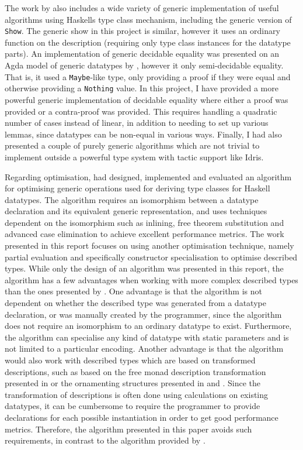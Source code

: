 \documentclass{ituthesis}
\newcommand{\ttconstructor}[1]{\textcolor{constructor-color}{\texttt{#1}}}
\newcommand{\tttype}[1]{\textcolor{type-color}{\texttt{#1}}}
\theoremstyle{break}
\begin{document}
The work by \citeauthor{magalhaes2012less} also includes a wide variety of generic implementation of useful algorithms using Haskells type class mechanism, including the generic version of \tttype{Show}.
The generic show in this project is similar, however it uses an ordinary function on the description (requiring only type class instances for the datatype parts).
An implementation of generic decidable equality was presented on an Agda model of generic datatypes by \citeauthor{magalhaes2012less}, however it only semi-decidable equality.
That is, it used a \tttype{Maybe}-like type, only providing a proof if they were equal and otherwise providing a \ttconstructor{Nothing} value.
In this project, I have provided a more powerful generic implementation of decidable equality where either a proof was provided or a contra-proof was provided.
This requires handling a quadratic number of cases instead of linear, in addition to needing to set up various lemmas, since datatypes can be non-equal in various ways.
Finally, I had also presented a couple of purely generic algorithms which are not trivial to implement outside a powerful type system with tactic support like Idris.

Regarding optimisation, \citeauthor{magalhaes2012less} had designed, implemented and evaluated an algorithm for optimising generic operations used for deriving type classes for Haskell datatypes.
The algorithm requires an isomorphism between a datatype declaration and its equivalent generic representation, and uses techniques dependent on the isomorphism such as inlining, free theorem substitution and advanced case elimination to achieve excellent performance metrics.
The work presented in this report focuses on using another optimisation technique, namely partial evaluation and specifically constructor specialisation to optimise described types.
While only the design of an algorithm was presented in this report, the algorithm has a few advantages when working with more complex described types than the ones presented by \citeauthor{magalhaes2012less}.
One advantage is that the algorithm is not dependent on whether the described type was generated from a datatype declaration, or was manually created by the programmer, since the algorithm does not require an isomorphism to an ordinary datatype to exist.
Furthermore, the algorithm can specialise any kind of datatype with static parameters and is not limited to a particular encoding.
Another advantage is that the algorithm would also work with described types which are based on transformed descriptions, such as based on the free monad description transformation presented in \textcite{Chapman:2010:GAL:1863543.1863547} or the ornamenting structures presented in \textcite{mcbride2010ornamental} and \textcite{dagand2012transporting}.
Since the transformation of descriptions is often done using calculations on existing datatypes, it can be cumbersome to require the programmer to provide declarations for each possible instantiation in order to get good performance metrics.
Therefore, the algorithm presented in this paper avoids such requirements, in contrast to the algorithm provided by \citeauthor{magalhaes2012less}.
\end{document}
